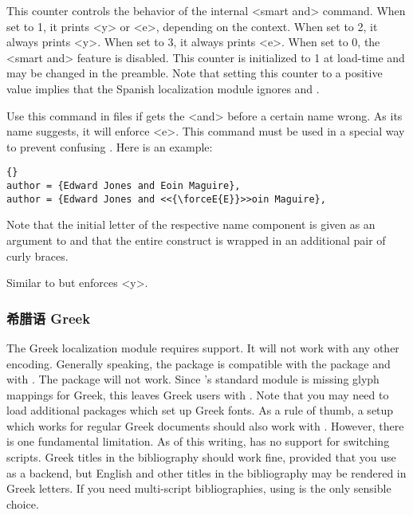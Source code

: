 \begin{ltxsyntax}


This counter controls the behavior of the internal <smart and> command. When set to 1, it prints <y> or <e>, depending on the context. When set to 2, it always prints <y>. When set to 3, it always prints <e>. When set to 0, the <smart and> feature is disabled. This counter is initialized to 1 at load-time and may be changed in the preamble. Note that setting this counter to a positive value implies that the Spanish localization module ignores  and .


Use this command in  files if \biblatex gets the <and> before a certain name wrong. As its name suggests, it will enforce <e>. This command must be used in a special way to prevent confusing \bibtex. Here is an example:

\begin{lstlisting}[style=bibtex]{}
author = {Edward Jones and Eoin Maguire},
author = {Edward Jones and <<{\forceE{E}}>>oin Maguire},
\end{lstlisting}
%
Note that the initial letter of the respective name component is given as an argument to  and that the entire construct is wrapped in an additional pair of curly braces.


Similar to  but enforces <y>.

\end{ltxsyntax}

\subsubsection{希腊语 Greek}
\label{use:loc:grk}

The Greek localization module requires \utf support. It will not work with any other encoding. Generally speaking, the \biblatex package is compatible with the  package and with \xelatex. The  package will not work. Since 's standard  module is missing glyph mappings for Greek, this leaves Greek users with \xelatex. Note that you may need to load additional packages which set up Greek fonts. As a rule of thumb, a setup which works for regular Greek documents should also work with \biblatex. However, there is one fundamental limitation. As of this writing, \biblatex has no support for switching scripts. Greek titles in the bibliography should work fine, provided that you use \biber as a backend, but English and other titles in the bibliography may be rendered in Greek letters. If you need multi-script bibliographies, using \xelatex is the only sensible choice.

